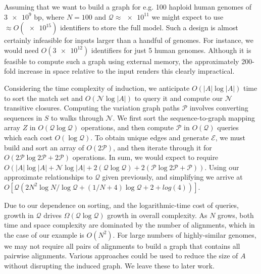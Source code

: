 \documentclass{bioinfo}
\theoremstyle{definition}
\begin{document}
Assuming that we want to build a graph for e.g. 100 haploid human genomes of $\num{3e9}$ bp, where $N=100$ and $\mathcal{Q} \approx \num{e11}$ we might expect to use $\approx O(\num{e15})$ identifiers to store the full model.
Such a design is almost certainly infeasible for inputs larger than a handful of genomes.
For instance, we would need $O(\num{3e12})$ identifiers for just 5 human genomes.
Although it is feasible to compute such a graph using external memory, the approximately 200-fold increase in space relative to the input renders this clearly impractical.

Considering the time complexity of induction, we anticipate $O(|A|\log|A|)$ time to sort the match set and $O(\mathcal{N} \log |A|)$ to query it and compute our $\mathcal{N}$ transitive closures.
Computing the variation graph paths $\mathcal{P}$ involves converting sequences in $S$ to walks through $\mathcal{N}$.
We first sort the sequence-to-graph mapping array $Z$ in $O(\mathcal{Q} \log \mathcal{Q})$ operations, and then compute $\mathcal{P}$ in $O(\mathcal{Q})$ queries which each cost $O(\log \mathcal{Q})$.
To obtain unique edges and generate $\mathcal{E}$, we must build and sort an array of $O(2\mathcal{P})$, and then iterate through it for $O(2\mathcal{P} \log 2\mathcal{P} + 2\mathcal{P})$ operations.
In sum, we would expect to require $O(|A|\log|A| + \mathcal{N} \log |A| + 2(\mathcal{Q} \log \mathcal{Q}) + 2(\mathcal{P} \log 2\mathcal{P} + \mathcal{P}))$.
Using our approximate relationships to $\mathcal{Q}$ given previously, and simplifying we arrive at $O[\mathcal{Q}(2N^2 \log N / \log \mathcal{Q} + (1/N + 4)\log \mathcal{Q} + 2 + log(4))]$.

Due to our dependence on sorting, and the logarithmic-time cost of queries, growth in $\mathcal{Q}$ drives $\Omega(\mathcal{Q} \log \mathcal{Q})$ growth in overall complexity.
As $N$ grows, both time and space complexity are dominated by the number of alignments, which in the case of our example is $O(N^2)$.
For large numbers of highly-similar genomes, we may not require all pairs of alignments to build a graph that contains all pairwise alignments.
Various approaches could be used to reduce the size of $A$ without disrupting the induced graph.
We leave these to later work.

\end{document}
